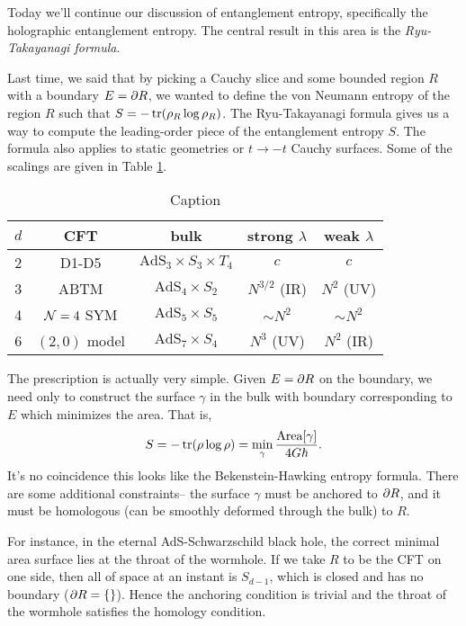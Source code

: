 Today we'll continue our discussion of entanglement entropy, specifically the holographic entanglement entropy. The central result in this area is the \emph{Ryu-Takayanagi formula}.

Last time, we said that by picking a Cauchy slice and some bounded region $R$ with a boundary $E=\partial R$, we wanted to define the von Neumann entropy of the region $R$ such that $S=-\operatorname{tr} (\rho_R \log \rho_R)$. The Ryu-Takayanagi formula gives us a way to compute the leading-order piece of the entanglement entropy $S$. The formula also applies to static geometries or $t\to -t$ Cauchy surfaces. Some of the scalings are given in Table \ref{tab:cft_entropyscaling}.

\begin{table}[]
    \centering
    \begin{tabular}{c c | c | c c}
         $d$ & CFT & bulk & strong $\lambda$ & weak $\lambda$ \\\hline
         2 & D1-D5 & $\text{AdS}_3 \times S_3 \times T_4$ & $c$ & $c$ \\
         3 & ABTM & $\text{AdS}_4\times S_2$ & $N^{3/2}$ (IR) & $N^2$ (UV) \\
         4 & $\mathcal N=4$ SYM & $\text{AdS}_5 \times S_5$ & $\sim N^2$ & $\sim N^2$\\
         6 & $(2,0)$ model & $\text{AdS}_7\times S_4$ & $N^3$ (UV) & $N^2$ (IR)\\
    \end{tabular}
    \caption{Caption}
    \label{tab:cft_entropyscaling}
\end{table}

The prescription is actually very simple. Given $E=\partial R$ on the boundary, we need only to construct the surface $\gamma$ in the bulk with boundary corresponding to $E$ which minimizes the area. That is,
\begin{equation}
    S=-\operatorname{tr}(\rho \log \rho) = \min_\gamma \frac{\text{Area}[\gamma]}{4 G \hbar}.
\end{equation}
It's no coincidence this looks like the Bekenstein-Hawking entropy formula. There are some additional constraints-- the surface $\gamma$ must be anchored to $\partial R$, and it must be homologous (can be smoothly deformed through the bulk) to $R$.

For instance, in the eternal AdS-Schwarzschild black hole, the correct minimal area surface lies at the throat of the wormhole. If we take $R$ to be the CFT on one side, then all of space at an instant is $S_{d-1}$, which is closed and has no boundary ($\partial R = \{\}$). Hence the anchoring condition is trivial and the throat of the wormhole satisfies the homology condition.

